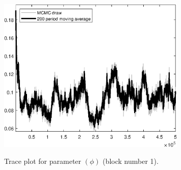 \begin{figure}[H]
\centering
  \includegraphics[width=0.8\textwidth]{BRS_growth_ext_shopping/graphs/TracePlot_phi_blck_1}\\
    \caption{Trace plot for parameter $(\phi)$ (block number 1).}
\end{figure}
